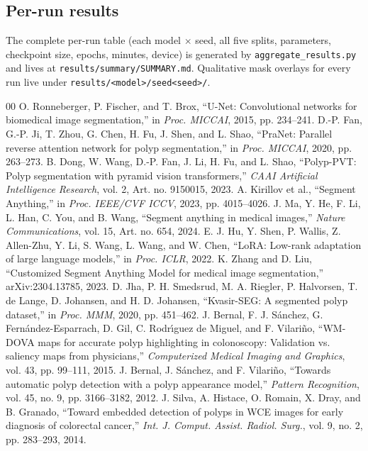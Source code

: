 \documentclass[conference]{IEEEtran}
\begin{document}
\subsection{Per-run results}
The complete per-run table (each model $\times$ seed, all five splits, parameters, checkpoint size, epochs, minutes, device) is generated by \texttt{aggregate\_results.py} and lives at \texttt{results/summary/SUMMARY.md}. Qualitative mask overlays for every run live under \texttt{results/<model>/seed<seed>/}.


\begin{thebibliography}{00}
 O. Ronneberger, P. Fischer, and T. Brox, ``U-Net: Convolutional networks for biomedical image segmentation,'' in \textit{Proc. MICCAI}, 2015, pp. 234--241.
 D.-P. Fan, G.-P. Ji, T. Zhou, G. Chen, H. Fu, J. Shen, and L. Shao, ``PraNet: Parallel reverse attention network for polyp segmentation,'' in \textit{Proc. MICCAI}, 2020, pp. 263--273.
 B. Dong, W. Wang, D.-P. Fan, J. Li, H. Fu, and L. Shao, ``Polyp-PVT: Polyp segmentation with pyramid vision transformers,'' \textit{CAAI Artificial Intelligence Research}, vol. 2, Art. no. 9150015, 2023.
 A. Kirillov et al., ``Segment Anything,'' in \textit{Proc. IEEE/CVF ICCV}, 2023, pp. 4015--4026.
 J. Ma, Y. He, F. Li, L. Han, C. You, and B. Wang, ``Segment anything in medical images,'' \textit{Nature Communications}, vol. 15, Art. no. 654, 2024.
 E. J. Hu, Y. Shen, P. Wallis, Z. Allen-Zhu, Y. Li, S. Wang, L. Wang, and W. Chen, ``LoRA: Low-rank adaptation of large language models,'' in \textit{Proc. ICLR}, 2022.
 K. Zhang and D. Liu, ``Customized Segment Anything Model for medical image segmentation,'' arXiv:2304.13785, 2023.
 D. Jha, P. H. Smedsrud, M. A. Riegler, P. Halvorsen, T. de Lange, D. Johansen, and H. D. Johansen, ``Kvasir-SEG: A segmented polyp dataset,'' in \textit{Proc. MMM}, 2020, pp. 451--462.
 J. Bernal, F. J. S\'anchez, G. Fern\'andez-Esparrach, D. Gil, C. Rodr\'{\i}guez de Miguel, and F. Vilari\~no, ``WM-DOVA maps for accurate polyp highlighting in colonoscopy: Validation vs. saliency maps from physicians,'' \textit{Computerized Medical Imaging and Graphics}, vol. 43, pp. 99--111, 2015.
 J. Bernal, J. S\'anchez, and F. Vilari\~no, ``Towards automatic polyp detection with a polyp appearance model,'' \textit{Pattern Recognition}, vol. 45, no. 9, pp. 3166--3182, 2012.
 J. Silva, A. Histace, O. Romain, X. Dray, and B. Granado, ``Toward embedded detection of polyps in WCE images for early diagnosis of colorectal cancer,'' \textit{Int. J. Comput. Assist. Radiol. Surg.}, vol. 9, no. 2, pp. 283--293, 2014.

\end{thebibliography}
\end{document}
